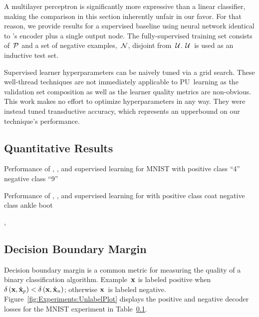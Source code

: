 A multilayer perceptron is significantly more expressive than a linear classifier, making the comparison in this section inherently unfair in our favor. For that reason, we provide results for a supervised baseline using neural network identical to \toolname's encoder plus a single output node.  The fully-supervised training set consists of~$\mathcal{P}$ and a set of negative examples,~$\mathcal{N}$, disjoint from~$\mathcal{U}$.  $\mathcal{U}$~is used as an inductive test set.

Supervised learner hyperparameters can be naively tuned via a grid search.  These well-thread techniques are not immediately applicable to PU~learning as the validation set composition as well as the learner quality metrics are non-obvious.  This work makes no effort to optimize hyperparameters in any way.  They were instead tuned transductive accuracy, which represents an upperbound on our technique's performance.

\subsection{Quantitative Results}

\begin{table}[t]
  \centering
  \caption{Performance of \toolname, \elkan, and supervised learning for MNIST with positive class ``4'' negative class ``9''}\label{tab:Experiment:MNIST}
  
\end{table}

\begin{table}[t]
  \centering
  \caption{Performance of \toolname, \elkan, and supervised learning for \fashmnist with positive class coat negative class ankle boot}\label{tab:Experiment:MNIST}
  
\end{table}

\toolname,

\subsection{Decision Boundary Margin}\label{sec:Experiments:Margin}

Decision boundary margin is a common metric for measuring the quality of a binary classification algorithm. Example~$\mathbf{x}$ is labeled positive when ${\delta\left(\mathbf{x}, \hat{\mathbf{x}}_{p}\right)<\delta\left(\mathbf{x}, \hat{\mathbf{x}}_{n}\right)}$; otherwise $\mathbf{x}$~is labeled negative. Figure~\ref{fig:Experiments:UnlabelPlot} displays the positive and negative decoder losses for the MNIST experiment in Table~\ref{}.

